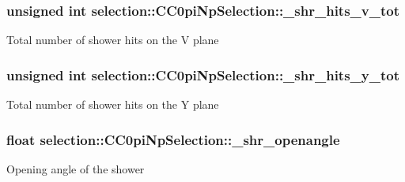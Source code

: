 \subsubsection[{\texorpdfstring{\+\_\+shr\+\_\+hits\+\_\+v\+\_\+tot}{_shr_hits_v_tot}}]{\setlength{\rightskip}{0pt plus 5cm}unsigned int selection\+::\+C\+C0pi\+Np\+Selection\+::\+\_\+shr\+\_\+hits\+\_\+v\+\_\+tot\hspace{0.3cm}{\ttfamily [private]}}\hypertarget{classselection_1_1CC0piNpSelection_ab6aaf4282fa9d2e5971e162c66901227}{}\label{classselection_1_1CC0piNpSelection_ab6aaf4282fa9d2e5971e162c66901227}
Total number of shower hits on the V plane 
\subsubsection[{\texorpdfstring{\+\_\+shr\+\_\+hits\+\_\+y\+\_\+tot}{_shr_hits_y_tot}}]{\setlength{\rightskip}{0pt plus 5cm}unsigned int selection\+::\+C\+C0pi\+Np\+Selection\+::\+\_\+shr\+\_\+hits\+\_\+y\+\_\+tot\hspace{0.3cm}{\ttfamily [private]}}\hypertarget{classselection_1_1CC0piNpSelection_a6a43c3523af47860ad1682ebe14bb8e3}{}\label{classselection_1_1CC0piNpSelection_a6a43c3523af47860ad1682ebe14bb8e3}
Total number of shower hits on the Y plane 
\subsubsection[{\texorpdfstring{\+\_\+shr\+\_\+openangle}{_shr_openangle}}]{\setlength{\rightskip}{0pt plus 5cm}float selection\+::\+C\+C0pi\+Np\+Selection\+::\+\_\+shr\+\_\+openangle\hspace{0.3cm}{\ttfamily [private]}}\hypertarget{classselection_1_1CC0piNpSelection_a33b26acb3cdb05cb1b81800d8af48a03}{}\label{classselection_1_1CC0piNpSelection_a33b26acb3cdb05cb1b81800d8af48a03}
Opening angle of the shower 
